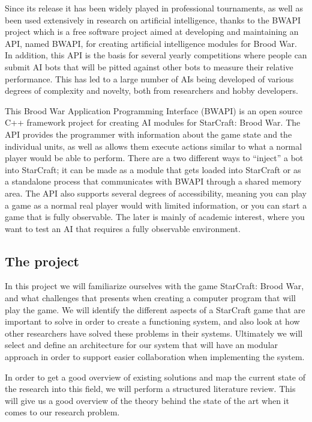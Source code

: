 Since its release it has been widely played in professional tournaments, as well
as been used extensively in research on artificial intelligence, thanks to the
BWAPI project which is a free software project aimed at developing and
maintaining an API, named BWAPI, for creating artificial intelligence modules
for Brood War. In addition, this API is the basis for several yearly
competitions where people can submit AI bots that will be pitted against other
bots to measure their relative performance. This has led to a large number of
AIs being developed of various degrees of complexity and novelty, both from
researchers and hobby developers. 

This Brood War Application Programming Interface (BWAPI) is an open source C++
framework project for creating AI modules for StarCraft: Brood War. The API
provides the programmer with information about the game state and the individual
units, as well as allows them execute actions similar to what a normal player
would be able to perform. There are a two different ways to ``inject'' a bot
into StarCraft; it can be made as a module that gets loaded into StarCraft or as
a standalone process that communicates with BWAPI through a shared memory area.
The API also supports several degrees of accessibility, meaning you can play a
game as a normal real player would with limited information, or you can start a
game that is fully observable. The later is mainly of academic interest, where
you want to test an AI that requires a fully observable environment.  

\subsection{The project}
In this project we will familiarize ourselves with the game StarCraft: Brood
War, and what challenges that presents when creating a computer program that
will play the game. We will identify the different aspects of a StarCraft game
that are important to solve in order to create a functioning system, and also
look at how other researchers have solved these problems in their systems.
Ultimately we will select and define an architecture for our system that will
have an modular approach in order to support easier collaboration when
implementing the system. 

In order to get a good overview of existing solutions and map the current state
of the research into this field, we will perform a structured literature review.
This will give us a good overview of the theory behind the state of the art
when it comes to our research problem.

